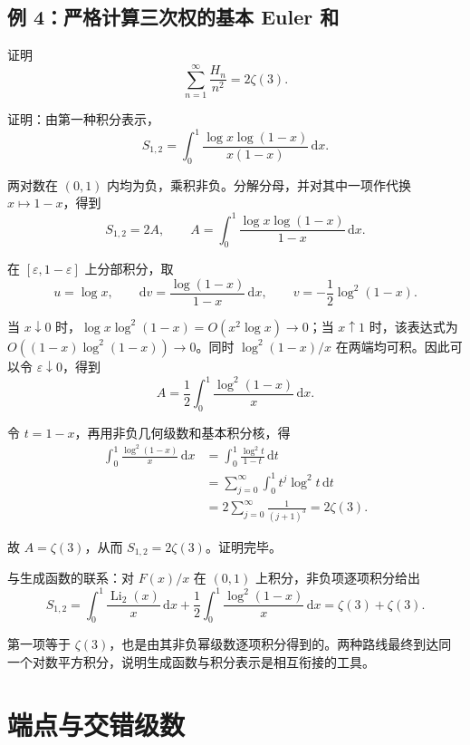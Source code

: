 \documentclass[11pt,a4paper]{article}
\newenvironment{proofblock}{\par\Needspace{4\baselineskip}\noindent}{\par}
\begin{document}
\hypertarget{sec-5-3}{%
\subsection{例 4：严格计算三次权的基本 Euler 和}\label{sec-5-3}}

证明
\[
\sum_{n=1}^{\infty}\frac{H_n}{n^2}=2\zeta(3).
\]

\begin{proofblock}

证明：由第一种积分表示，
\[
S_{1,2}=\int_0^1\frac{\log x\log(1-x)}{x(1-x)}\,\mathrm dx.
\]

两对数在 \((0,1)\) 内均为负，乘积非负。分解分母，并对其中一项作代换 \(x\mapsto1-x\)，得到
\[
S_{1,2}=2A,
\qquad
A=\int_0^1\frac{\log x\log(1-x)}{1-x}\,\mathrm dx.
\]

在 \([\varepsilon,1-\varepsilon]\) 上分部积分，取
\[
u=\log x,
\qquad
\mathrm dv=\frac{\log(1-x)}{1-x}\,\mathrm dx,
\qquad
v=-\frac12\log^2(1-x).
\]

当 \(x\downarrow0\) 时，\(\log x\log^2(1-x)=O(x^2\log x)\to0\)；当 \(x\uparrow1\) 时，该表达式为 \(O((1-x)\log^2(1-x))\to0\)。同时 \(\log^2(1-x)/x\) 在两端均可积。因此可以令 \(\varepsilon\downarrow0\)，得到
\[
A=\frac12\int_0^1\frac{\log^2(1-x)}x\,\mathrm dx.
\]

令 \(t=1-x\)，再用非负几何级数和基本积分核，得
\[
\begin{aligned}
\int_0^1\frac{\log^2(1-x)}x\,\mathrm dx
&=\int_0^1\frac{\log^2t}{1-t}\,\mathrm dt\\
&=\sum_{j=0}^{\infty}\int_0^1t^j\log^2t\,\mathrm dt\\
&=2\sum_{j=0}^{\infty}\frac1{(j+1)^3}
=2\zeta(3).
\end{aligned}
\]

故 \(A=\zeta(3)\)，从而 \(S_{1,2}=2\zeta(3)\)。证明完毕。

\end{proofblock}

与生成函数的联系：对 \(F(x)/x\) 在 \((0,1)\) 上积分，非负项逐项积分给出
\[
S_{1,2}=\int_0^1\frac{\operatorname{Li}_2(x)}x\,\mathrm dx
+\frac12\int_0^1\frac{\log^2(1-x)}x\,\mathrm dx
=\zeta(3)+\zeta(3).
\]

第一项等于 \(\zeta(3)\)，也是由其非负幂级数逐项积分得到的。两种路线最终到达同一个对数平方积分，说明生成函数与积分表示是相互衔接的工具。

\hypertarget{sec-6}{%
\section{端点与交错级数}\label{sec-6}}
\end{document}
